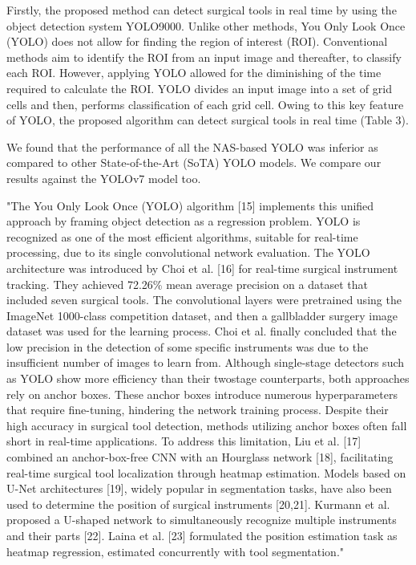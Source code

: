 Firstly, the proposed method can detect surgical tools in real time by using the object detection system YOLO9000. Unlike other methods, You Only Look Once (YOLO) does not allow for finding the region of interest (ROI). Conventional methods aim to identify the ROI from an input image and thereafter, to classify each ROI. However, applying YOLO allowed for the diminishing of the time required to calculate the ROI. YOLO divides an input image into a set of grid cells and then, performs classification of each grid cell. Owing to this key feature of YOLO, the proposed algorithm can detect surgical tools in real time (Table 3).

We found that the performance of all the NAS-based YOLO was inferior as compared to other State-of-the-Art (SoTA) YOLO models. We compare our results against the YOLOv7 model too.

"The You Only Look Once (YOLO) algorithm [15] implements this unified approach by framing object detection as a regression problem. YOLO is recognized as one of the most efficient algorithms, suitable for real-time processing, due to its single convolutional network evaluation. The YOLO architecture was introduced by Choi et al. [16] for real-time surgical instrument tracking. They achieved 72.26\% mean average precision on a dataset that included seven surgical tools. The convolutional layers were pretrained using the ImageNet 1000-class competition dataset, and then a gallbladder surgery image dataset was used for the learning process. Choi et al. finally concluded that the low precision in the detection of some specific instruments was due to the insufficient number of images to learn from. Although single-stage detectors such as YOLO show more efficiency than their twostage counterparts, both approaches rely on anchor boxes. These anchor boxes introduce numerous hyperparameters that require fine-tuning, hindering the network training process. Despite their high accuracy in surgical tool detection, methods utilizing anchor boxes often fall short in real-time applications. To address this limitation, Liu et al. [17] combined an anchor-box-free CNN with an Hourglass network [18], facilitating real-time surgical tool localization through heatmap estimation. Models based on U-Net architectures [19], widely popular in segmentation tasks, have also been used to determine the position of surgical instruments [20,21]. Kurmann et al. proposed a U-shaped network to simultaneously recognize multiple instruments and their parts [22]. Laina et al. [23] formulated the position estimation task as heatmap regression, estimated concurrently with tool segmentation."

